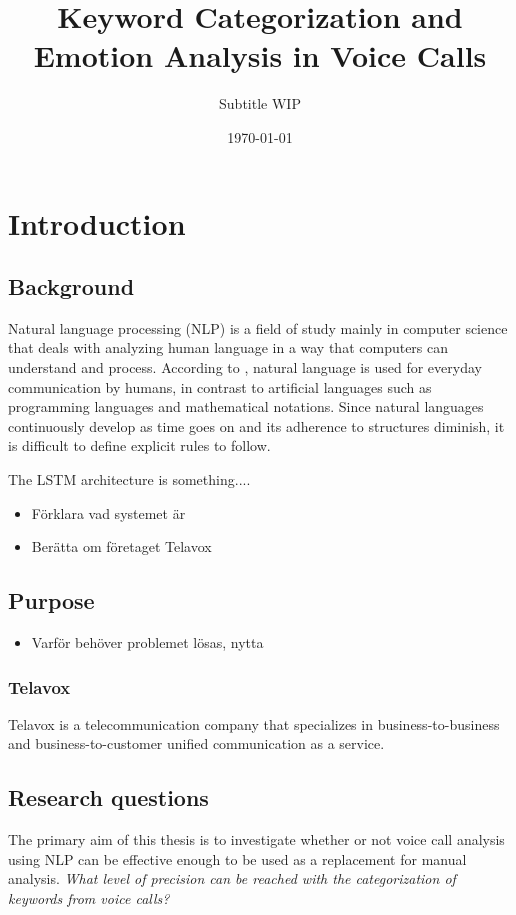 \documentclass[nofilelist]{cslthse-msc}
\title{Keyword Categorization and Emotion Analysis in Voice Calls}
\subtitle{Subtitle WIP}
\date{\today}
\begin{document}
\renewcommand{\bibname}{References}

\makefrontmatter
\chapter{Introduction}

\section{Background}
Natural language processing (NLP) is a field of study mainly in computer science that deals with analyzing human language in a way that computers can understand and process. According to \citet{ntlk2009}, natural language is used for everyday communication by humans, in contrast to artificial languages such as programming languages and mathematical notations. Since natural languages continuously develop as time goes on and its adherence to structures diminish, it is difficult to define explicit rules to follow. 


The LSTM architecture \citep{ntlk2009} is something....

\begin{itemize}
    \item Förklara vad systemet är
    \item Berätta om företaget Telavox
\end{itemize}

\section{Purpose}
\begin{itemize}
    \item Varför behöver problemet lösas, nytta
\end{itemize}
\subsection{Telavox}
Telavox is a telecommunication company that specializes in business-to-business and business-to-customer unified communication as a service. 
\section{Research questions}
The primary aim of this thesis is to investigate whether or not voice call analysis using NLP can be effective enough to be used as a replacement for manual analysis. 
\textit{What level of precision can be reached with the categorization of keywords from voice calls? }
\end{document}
